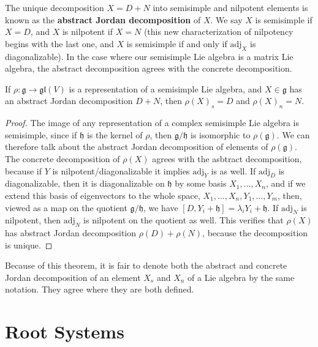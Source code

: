 The unique decomposition $X = D + N$ into semisimple and nilpotent elements is known as the {\bf abstract Jordan decomposition} of $X$. We say $X$ is semisimple if $X = D$, and $X$ is nilpotent if $X = N$ (this new characterization of nilpotency begins with the last one, and $X$ is semisimple if and only if $\text{adj}_X$ is diagonalizable). In the case where our semisimple Lie algebra is a matrix Lie algebra, the abstract decomposition agrees with the concrete decomposition.

\begin{theorem}
    If $\rho: \mathfrak{g} \to \mathfrak{gl}(V)$ is a representation of a semisimple Lie algebra, and $X \in \mathfrak{g}$ has an abstract Jordan decomposition $D + N$, then $\rho(X)_s = D$ and $\rho(X)_n = N$.
\end{theorem}
\begin{proof}
    The image of any representation of a complex semisimple Lie algebra is semisimple, since if $\mathfrak{h}$ is the kernel of $\rho$, then $\mathfrak{g}/\mathfrak{h}$ is isomorphic to $\rho(\mathfrak{g})$. We can therefore talk about the abstract Jordan decomposition of elements of $\rho(\mathfrak{g})$. The concrete decomposition of $\rho(X)$ agrees with the asbtract decomposition, because if $Y$ is nilpotent/diagonalizable it implies $\text{adj}_Y$ is as well. If $\text{adj}_D$ is diagonalizable, then it is diagonalizable on $\mathfrak{h}$ by some basis $X_1, \dots, X_n$, and if we extend this basis of eigenvectors to the whole space, $X_1, \dots, X_n, Y_1, \dots, Y_m$, then, viewed as a map on the quotient $\mathfrak{g}/\mathfrak{h}$, we have $[D, Y_i + \mathfrak{h}] = \lambda_i Y_i + \mathfrak{h}$. If $\text{adj}_N$ is nilpotent, then $\text{adj}_N$ is nilpotent on the quotient as well. This verifies that $\rho(X)$ has abstract Jordan decomposition $\rho(D) + \rho(N)$, because the decomposition is unique.
\end{proof}

Because of this theorem, it is fair to denote both the abstract and concrete Jordan decomposition of an element $X_s$ and $X_n$ of a Lie algebra by the same notation. They agree where they are both defined.

\section{Root Systems}

